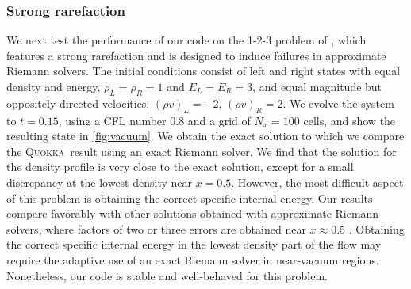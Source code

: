 \documentclass[fleqn,usenatbib]{mnras}
\newcommand{\quokka}{\textsc{Quokka}}
\begin{document}
\subsubsection{Strong rarefaction}
\label{section:rarefaction}
We next test the performance of our code on the 1-2-3 problem of \cite{Einfeldt_1991}, which features a strong rarefaction and is designed to induce failures in approximate Riemann solvers. The initial conditions consist of left and right states with equal density and energy, $\rho_L = \rho_R = 1$ and $E_L = E_R = 3$, and equal magnitude but oppositely-directed velocities, $(\rho v)_L = -2$, $(\rho v)_R = 2$. We evolve the system to $t=0.15$, using a CFL number $0.8$ and a grid of $N_x = 100$ cells, and show the resulting state in \autoref{fig:vacuum}. We obtain the exact solution to which we compare the \quokka~result using an exact Riemann solver. We find that the solution for the density profile is very close to the exact solution, except for a small discrepancy at the lowest density near $x = 0.5$. However, the most difficult aspect of this problem is obtaining the correct specific internal energy. Our results compare favorably with other solutions obtained with approximate Riemann solvers, where factors of two or three errors are obtained near $x \approx 0.5$ \citep{Toro_2013}. Obtaining the correct specific internal energy in the lowest density part of the flow may require the adaptive use of an exact Riemann solver in near-vacuum regions. Nonetheless, our code is stable and well-behaved for this problem.
\end{document}
